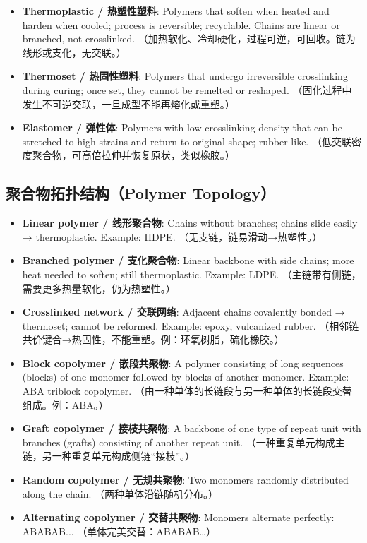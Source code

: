 \documentclass[12pt,a4paper]{ctexart}
\begin{document}
\begin{itemize}[leftmargin=*]
    \item \textbf{Thermoplastic / 热塑性塑料}: Polymers that soften when heated and harden when cooled; process is reversible; recyclable. Chains are linear or branched, not crosslinked. （加热软化、冷却硬化，过程可逆，可回收。链为线形或支化，无交联。）
    \item \textbf{Thermoset / 热固性塑料}: Polymers that undergo irreversible crosslinking during curing; once set, they cannot be remelted or reshaped. （固化过程中发生不可逆交联，一旦成型不能再熔化或重塑。）
    \item \textbf{Elastomer / 弹性体}: Polymers with low crosslinking density that can be stretched to high strains and return to original shape; rubber-like. （低交联密度聚合物，可高倍拉伸并恢复原状，类似橡胶。）
\end{itemize}

\subsection{聚合物拓扑结构（Polymer Topology）}
\begin{itemize}[leftmargin=*]
    \item \textbf{Linear polymer / 线形聚合物}: Chains without branches; chains slide easily → thermoplastic. Example: HDPE. （无支链，链易滑动→热塑性。）
    \item \textbf{Branched polymer / 支化聚合物}: Linear backbone with side chains; more heat needed to soften; still thermoplastic. Example: LDPE. （主链带有侧链，需要更多热量软化，仍为热塑性。）
    \item \textbf{Crosslinked network / 交联网络}: Adjacent chains covalently bonded → thermoset; cannot be reformed. Example: epoxy, vulcanized rubber. （相邻链共价键合→热固性，不能重塑。例：环氧树脂，硫化橡胶。）
    \item \textbf{Block copolymer / 嵌段共聚物}: A polymer consisting of long sequences (blocks) of one monomer followed by blocks of another monomer. Example: ABA triblock copolymer. （由一种单体的长链段与另一种单体的长链段交替组成。例：ABA。）
    \item \textbf{Graft copolymer / 接枝共聚物}: A backbone of one type of repeat unit with branches (grafts) consisting of another repeat unit. （一种重复单元构成主链，另一种重复单元构成侧链“接枝”。）
    \item \textbf{Random copolymer / 无规共聚物}: Two monomers randomly distributed along the chain. （两种单体沿链随机分布。）
    \item \textbf{Alternating copolymer / 交替共聚物}: Monomers alternate perfectly: ABABAB... （单体完美交替：ABABAB…）
\end{itemize}
\end{document}

